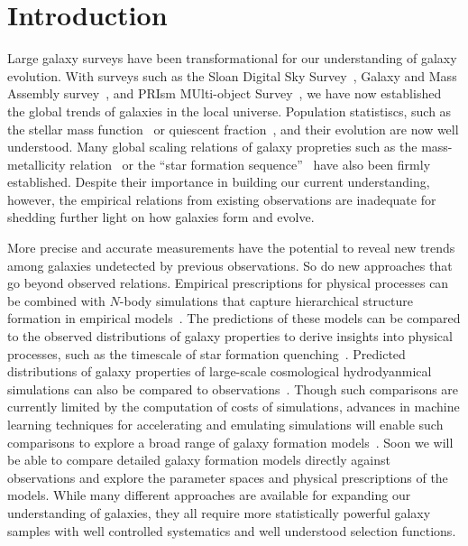 \section{Introduction} \label{sec:intro} 
Large galaxy surveys have been transformational for our understanding of galaxy
evolution. 
With surveys such as the Sloan Digital Sky Survey~\citep[SDSS;][]{york2000},
Galaxy and Mass Assembly survey~\citep[GAMA;][]{driver2011}, and 
PRIsm MUlti-object Survey~\citep[PRIMUS;][]{coil2011}, 
we have now established the global trends of galaxies in the local universe. 
Population statistiscs, such as the stellar mass 
function~\citep{li2009, marchesini2009, moustakas2013} or quiescent
fraction~\citep{kauffmann2003a, blanton2003, baldry2006, taylor2009}, and their
evolution are now well understood. 
Many global scaling relations of galaxy propreties such as the mass-metallicity
relation~\citep{tremonti2004} or
the ``star formation sequence''~\citep{noeske2007, daddi2007, salim2007} have
also been firmly established. 
Despite their importance in building our current understanding, however,
the empirical relations from existing observations are inadequate for
shedding further light on how galaxies form and evolve.

More precise and accurate measurements have the potential to reveal new trends
among galaxies undetected by previous observations.
So do new approaches that go beyond observed relations.
Empirical prescriptions for physical processes can be combined with $N$-body
simulations that capture hierarchical structure formation in empirical 
models~\citep[\emph{e.g.} {\sc UniverseMachine};][]{behroozi2019}. 
The predictions of these models can be compared to the observed distributions
of galaxy properties to derive insights into physical processes, such as the
timescale of star formation quenching~\citep{wetzel2013, hahn2017, tinker2017}. 
Predicted distributions of galaxy properties of large-scale cosmological 
hydrodyanmical simulations can also be compared to 
observations~\citep[\emph{e.g.}][]{genel2014, somerville2015a, dave2017a,
trayford2017, dickey2021, donnari2021}.
Though such comparisons are currently limited by the computation of costs of
simulations, advances in machine learning techniques for accelerating and
emulating simulations will enable such comparisons to explore a broad range of
galaxy formation models~\citep[\emph{e.g.}][]{villaescusa-navarro2021}.
Soon we will be able to compare detailed galaxy formation models directly
against observations and explore the parameter spaces and physical
prescriptions of the models. 
While many different approaches are available for expanding our understanding
of galaxies, they all require more statistically powerful galaxy samples with
well controlled systematics and well understood selection functions. 

